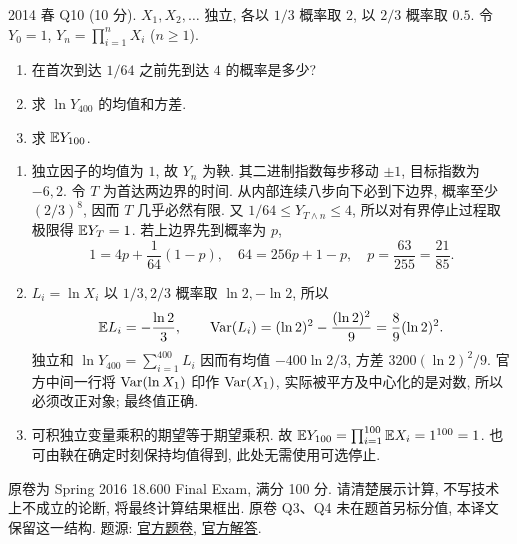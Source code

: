 \begin{exercise}\label{ex:fe2014q10}
2014 春 Q10 (10 分). $X_1,X_2,\ldots$ 独立, 各以 $1/3$ 概率取 $2$, 以 $2/3$ 概率取 $0.5$. 令 $Y_0=1$, $Y_n=\prod_{i=1}^nX_i$ ($n\ge1$).
\begin{enumerate}[label=(\alph*)]
\item\label{ex:fe2014q10-a} 在首次到达 $1/64$ 之前先到达 $4$ 的概率是多少?
\item\label{ex:fe2014q10-b} 求 $\ln Y_{400}$ 的均值和方差.
\item\label{ex:fe2014q10-c} 求 $\mathbb E Y_{100}$.
\end{enumerate}
\end{exercise}
\begin{solution}
\begin{enumerate}[label=(\alph*)]
\item\label{sol:fe2014q10-a} 独立因子的均值为 $1$, 故 $Y_n$ 为鞅. 其二进制指数每步移动 $\pm1$, 目标指数为 $-6,2$. 令 $T$ 为首达两边界的时间. 从内部连续八步向下必到下边界, 概率至少 $(2/3)^8$, 因而 $T$ 几乎必然有限. 又 $1/64\le Y_{T\wedge n}\le4$, 所以对有界停止过程取极限得 $\mathbb E Y_T=1$. 若上边界先到概率为 $p$,
\[
 1=4p+\frac1{64}(1-p),\quad64=256p+1-p,\quad p=\frac{63}{255}=\frac{21}{85}.
\]
\item\label{sol:fe2014q10-b} $L_i=\ln X_i$ 以 $1/3,2/3$ 概率取 $\ln2,-\ln2$, 所以
\[
 \mathbb E L_i=-\frac{\ln2}{3},\qquad
 \operatorname{Var}(L_i)=(\ln2)^2-\frac{(\ln2)^2}{9}=\frac89(\ln2)^2.
\]
独立和 $\ln Y_{400}=\sum_{i=1}^{400}L_i$ 因而有均值 $-400\ln2/3$, 方差 $3200(\ln2)^2/9$. 官方中间一行将 $\operatorname{Var}(\ln X_1)$ 印作 $\operatorname{Var}(X_1)$, 实际被平方及中心化的是对数, 所以必须改正对象; 最终值正确.
\item\label{sol:fe2014q10-c} 可积独立变量乘积的期望等于期望乘积. 故 $\mathbb E Y_{100}=\prod_{i=1}^{100}\mathbb E X_i=1^{100}=1$. 也可由鞅在确定时刻保持均值得到, 此处无需使用可选停止.
\end{enumerate}
\end{solution}

原卷为 Spring 2016 18.600 Final Exam, 满分 100 分. 请清楚展示计算, 不写技术上不成立的论断, 将最终计算结果框出. 原卷 Q3、Q4 未在题首另标分值, 本译文保留这一结构.
题源: \href{https://ocw.mit.edu/courses/18-600-probability-and-random-variables-fall-2019/resources/mit18_600f19_final_2016/}{官方题卷}, \href{https://ocw.mit.edu/courses/18-600-probability-and-random-variables-fall-2019/resources/mit18_600f19_final_2016_soln/}{官方解答}.

